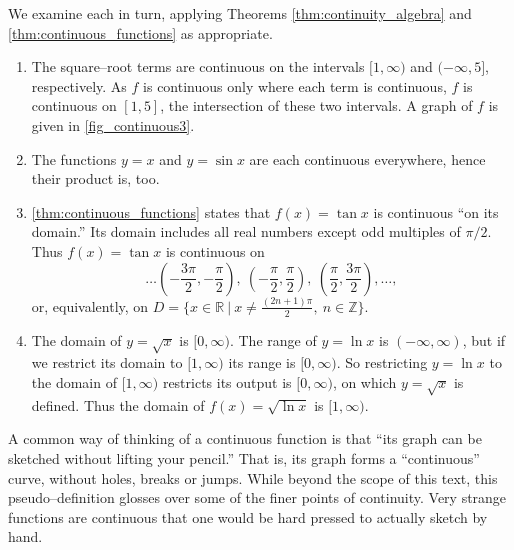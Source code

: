 {We examine each in turn, applying Theorems \ref{thm:continuity_algebra} and \ref{thm:continuous_functions} as appropriate.


\begin{enumerate}
	\item	The square--root terms are continuous on the intervals $[1,\infty)$ and $(-\infty,5]$, respectively. As $f$ is continuous only where each term is continuous, $f$ is continuous on $[1,5]$, the intersection of these two intervals. A graph of $f$ is given in \autoref{fig_continuous3}.

	\item	The functions $y=x$ and $y=\sin x$ are each continuous everywhere, hence their product is, too.
	\item	\autoref{thm:continuous_functions} states that $f(x) = \tan x$ is continuous ``on its domain.'' Its domain includes all real numbers except odd multiples of $\pi/2$. Thus $f(x) = \tan x$ is continuous on
	\[\ldots \left(-\frac{3\pi}{2},-\frac{\pi}2\right),\ \left(-\frac{\pi}2,\frac{\pi}2\right),\ \left(\frac{\pi}2,\frac{3\pi}2\right),\ldots,\]
	or, equivalently, on $D = \{x\in \mathbb{R}\ \vert\ x\neq \frac{(2n+1)\pi}2,\ n\in\mathbb{Z}\}$.
	\item	The domain of $y = \sqrt{x}$ is $[0,\infty)$. The range of $y=\ln x$ is $(-\infty,\infty)$, but if we restrict its domain to $[1,\infty)$ its range is $[0,\infty)$. So restricting $y = \ln x$ to the domain of $[1,\infty)$ restricts its output is $[0,\infty)$, on which $y = \sqrt{x}$ is defined. Thus the domain of $f(x) = \sqrt{\ln x}$ is $[1,\infty)$.\eoehere
\end{enumerate}}

A common way of thinking of a continuous function is that ``its graph can be sketched without lifting your pencil.'' That is, its graph forms a ``continuous'' curve, without holes, breaks or jumps. While beyond the scope of this text, this pseudo--definition glosses over some of the finer points of continuity. Very strange functions are continuous that one would be hard pressed to actually sketch by hand. 

